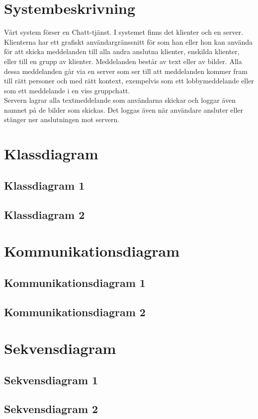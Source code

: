\documentclass[a4paper,11pt]{article}
\begin{document}
\section{Systembeskrivning}

Vårt system förser en Chatt-tjänst. I systemet finns det klienter och en server. Klienterna har ett grafiskt användargränssnitt för som han eller hon kan använda för att skicka meddelanden till alla andra anslutna klienter, enskilda klienter, eller till en grupp av klienter. Meddelanden består av text eller av bilder. Alla dessa meddelanden går via en server som ser till att meddelanden kommer fram till rätt personer och med rätt kontext, exempelvis som ett lobbymeddelande eller som ett meddelande i en viss gruppchatt.
\\
\newline
Servern lagrar alla textmeddelande som användarna skickar och loggar även namnet på de bilder som skickas. Det loggas även när användare ansluter eller stänger ner anslutningen mot servern.

\section{Klassdiagram}
\subsection{Klassdiagram 1}
\subsection{Klassdiagram 2}
\section{Kommunikationsdiagram}
\subsection{Kommunikationsdiagram 1}
\subsection{Kommunikationsdiagram 2}
\section{Sekvensdiagram}
\subsection{Sekvensdiagram 1}
\subsection{Sekvensdiagram 2}
\end{document}
